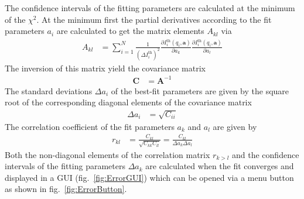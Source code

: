 The confidence intervals of the fitting parameters are calculated at the minimum of the $\chi^2$. At the minimum first the partial derivatives according to the fit parameters $a_i$ are calculated to get the matrix elements $A_{kl}$ via
\begin{align}
A_{kl} &= \sum_{i=1}^{N} \frac{1}{\left(\Delta I_i^\mathrm{th}\right)^2} \frac{\partial I_i^\mathrm{th}(q_i,\mathbf{a})}{\partial a_k} \frac{\partial I_i^\mathrm{th}(q_i,\mathbf{a})}{\partial a_l}
\end{align}
The inversion of this matrix yield the covariance matrix
\begin{align}
        \mathbf{C} &= \mathbf{A}^{-1}
\end{align}
The standard deviations $\Delta a_i$ of the best-fit parameters are given by the square root of the corresponding diagonal elements of the covariance matrix
\begin{align}
\Delta a_i &= \sqrt{C_{ii}}
\end{align}
The correlation coefficient of the fit parameters $a_k$ and $a_l$ are given by
\begin{align}
r_{kl} &= \frac{C_{kl}}{\sqrt{C_{kk}C_{ll}}} = \frac{C_{kl}}{\Delta a_k \Delta a_l}
\end{align}
Both the non-diagonal elements of the correlation matrix $r_{k>l}$ and the confidence intervals of the fitting parameters $\Delta a_k$ are calculated when the fit converges and displayed in a GUI (fig.\ \ref{fig:ErrorGUI}) which can be opened via a menu button as shown in fig.\ \ref{fig:ErrorButton}.

